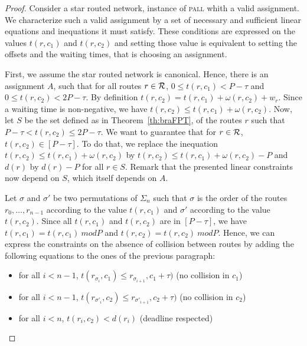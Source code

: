 \documentclass[a4paper,10pt]{article}
\newcommand\pall{\textsc{pall}\xspace}
\begin{document}
\begin{proof}
 Consider a star routed network, instance of \pall whith a valid assignment. We characterize such a valid assignment by a set of necessary and sufficient linear equations and inequations it must satisfy.  These conditions are expressed on the values $t(r,c_1)$ and $t(r,c_2)$ and setting those value is equivalent to setting the offsets and the waiting times, that is choosing an assignment.

First, we assume the star routed network is canonical. Hence, there is an assignment $A$, such that for all routes $r \in \cal{R}$, $0 \leq t(r,c_1) < P -\tau$ and $0 \leq t(r,c_2) < 2P-\tau$. 
By definition $t(r,c_2) = t(r,c_1) + \omega(r,c_2) + w_r$. Since a waiting time is non-negative, we have $t(r,c_2) \leq t(r,c_1) + \omega(r,c_2)$. 
Now, let $S$ be the set defined as in Theorem~\ref{th:braFPT}, of the routes $r$ such that  $P - \tau < t(r,c_2) \leq 2P - \tau$. We want to guarantee that for $r \in \cal{R}$, $t(r,c_2) \in [P-\tau]$.
To do that, we replace the inequation $t(r,c_2) \leq t(r,c_1) + \omega(r,c_2)$ by $t(r,c_2) \leq t(r,c_1) + \omega(r,c_2) - P$ and $d(r)$ by $d(r) - P$ for all $r \in S$. Remark that the presented linear constraints now depend on $S$, which itself depends on $A$.

 Let $\sigma$ and $\sigma'$ be two permutations of $\Sigma_n$ such that $\sigma$ is the order 
 of the routes $r_0,\dots, r_{n-1}$ according to the value $t(r,c_1)$ and $\sigma'$ according to the value $t(r,c_2)$.  Since all $t(r,c_1)$ and $t(r,c_2)$ are in $[P-\tau]$, we have $t(r,c_1) = t(r,c_1) \ mod P $ and $t(r,c_2) = t(r,c_2) \ mod P $. Hence, we can express the constraints on the absence of collision between routes by adding the following equations to the ones of the previous paragraph:
 
 \begin{itemize}
 	\item for all $i < n-1$, $t(r_{\sigma_{i}},c_1) \leq r_{\sigma_{i+1}},c_1 + \tau)$ (no collision in $c_1$)
 	\item for all $i < n-1$, $t(r_{\sigma'_{i}},c_2) \leq r_{\sigma'_{i+1}},c_2 + \tau)$ (no collision in $c_2$)
 	\item for all $i < n$,  $t(r_{i},c_2) < d(r_i)$ (deadline respected)
 \end{itemize}


\end{proof}
\end{document}
